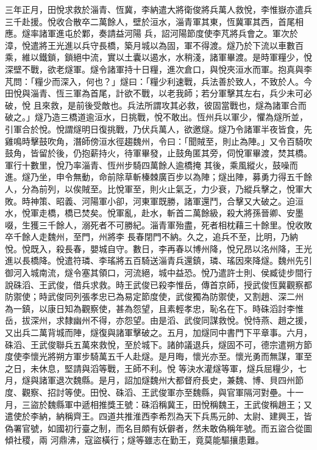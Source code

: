 \begin{pinyinscope}
 三年正月，田悅求救於淄青、恆冀，李納遣大將衛俊將兵萬人救悅，李惟嶽亦遣兵三千赴援。悅收合散卒二萬餘人，壁於洹水，淄青軍其東，恆冀軍其西，首尾相應。燧率諸軍進屯於鄴，奏請益河陽
 兵，詔河陽節度使李芃將兵會之。軍次於漳，悅遣將王光進以兵守長橋，築月城以為固，軍不得渡。燧乃於下流以車數百乘，維以鐵鎖，鎖絕中流，實以土囊以遏水，水稍淺，諸軍畢渡。是時軍糧少，悅深壁不戰，欲老燧軍。燧令諸軍持十日糧，進次倉口，與悅夾洹水而軍。抱真與李芃問：「糧少而深入，何也？」燧曰：「糧少利速戰，兵法善於致人，不致於人。今田悅與淄青、恆三軍為首尾，計欲不戰，以老我師；若分軍擊其左右，兵少未可必破，悅
 且來救，是前後受敵也。兵法所謂攻其必救，彼固當戰也，燧為諸軍合而破之。」燧乃造三橋道逾洹水，日挑戰，悅不敢出。恆州兵以軍少，懼為燧所並，引軍合於悅。悅謂燧明日復挑戰，乃伏兵萬人，欲邀燧。燧乃令諸軍半夜皆食，先雞鳴時擊鼓吹角，潛師傍洹水徑趨魏州，令曰：「聞賊至，則止為陣。」又令百騎吹鼓角，皆留於後，仍抱薪持火，待軍畢發，止鼓角匿其旁，伺悅軍畢渡，焚其橋。軍行十數里，悅乃率淄青、恆州步騎四萬餘人逾橋掩
 其後，乘風縱火，鼓噪而進。燧乃坐，申令無動，命前除草斬榛棘廣百步以為陣；燧出陣，募勇力得五千餘人，分為前列，以俟賊至。比悅軍至，則火止氣乏，力少衰，乃縱兵擊之，悅軍大敗。時神策、昭義、河陽軍小卻，河東軍既勝，諸軍還鬥，合擊又大破之。迫洹水，悅軍走橋，橋已焚矣。悅軍亂，赴水，斬首二萬餘級，殺大將孫晉卿、安墨啜，生獲三千餘人，溺死者不可勝紀。淄青軍殆盡，死者相枕藉三十餘里。悅收敗卒千餘人走魏州，至門，州將李
 長春閉門不納。久之，追兵不至，比明，乃納悅。悅既入，殺長春，嬰城自守。數日，李再春以博州降，悅兄昂以洺州降，王光進以長橋降。悅遣符璘、李瑤將五百騎送淄青兵還鎮，璘、瑤因來降燧。魏州先引御河入城南流，燧令塞其領口，河流絕，城中益恐。悅乃遣許士則、侯臧徒步間行說硃滔、王武俊，借兵求救。時王武俊已殺李惟岳，傳首京師，授武俊恆冀觀察都防禦使；時武俊同列張孝忠已為易定節度使，武俊獨為防禦使，又割趙、深二州
 為一鎮，以康日知為觀察使，甚為怨望，且素輕孝忠，恥名在下。時硃滔討李惟岳，拔深州，求隸幽州不得，亦怨望。由是滔、武俊同謀救悅。悅恃燕、趙之援，又出兵二萬背城而陣，燧復與諸軍擊破之。五月，加燧同中書門下平章事。六月，硃滔、王武俊聯兵五萬來救悅，至於城下。諸帥議退兵，燧固不可，德宗遣朔方節度使李懷光將朔方軍步騎萬五千人赴燧。是月晦，懷光亦至。懷光勇而無謀，軍至之日，未休息，堅請與滔等戰，王師不利。悅
 等決水灌燧等軍，燧兵屈糧少，七月，燧與諸軍退次魏縣。是月，詔加燧魏州大都督府長史，兼魏、博、貝四州節度、觀察、招討等使。田悅、硃滔、王武俊軍亦至魏縣，與官軍隔河對壘。十一月，三盜於魏縣軍中遞相推獎王號：硃滔稱冀王，田悅稱魏王，王武俊稱趙王；又遣使於李納，納稱齊王。四道共推淮西李希烈為天下兵馬元帥、太尉、建興王，皆偽署官號，如國初行臺之制，而名目頗有妖僻者，然未敢偽稱年號。而五盜合從圖傾社稷，兩
 河鼎沸，寇盜橫行；燧等雖志在勤王，竟莫能驅攘患難。




\end{pinyinscope}
